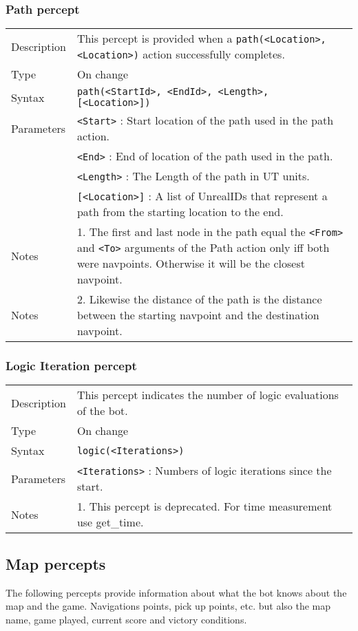\documentclass[11pt,a4paper]{article}
\begin{document}
\subsubsection*{Path percept}
\begin{small}
\begin{tabular}{p{2cm}p{9cm}}
Description & This percept is provided when a \verb|path(<Location>,<Location>)| action successfully completes. \\
Type & On change\\
Syntax & \verb|path(<StartId>, <EndId>, <Length>, [<Location>])|\\
Parameters 
	& \verb|<Start>| : Start location of the path used in the path action. \\
	& \verb|<End>| : End of location of the path used in the path. \\
	&  \verb|<Length>| : The Length of the path in UT units. \\
	& \verb|[<Location>]| : A list of UnrealIDs that represent a path from the starting location to the end. \\
Notes & 1.	The first and last node in the path equal the \verb|<From>| and \verb|<To>| arguments of the Path action only iff both were navpoints. Otherwise it will be the closest navpoint. \\
Notes & 2.	Likewise the distance of the path is the distance between the starting navpoint and the destination navpoint.
\end{tabular}
\end{small}

\subsubsection*{Logic Iteration percept}
\begin{small}
\begin{tabular}{p{2cm}p{9cm}}
Description & This percept indicates the number of logic evaluations of the bot. \\
Type & On change\\
Syntax & \verb|logic(<Iterations>)|\\
Parameters 
	&  \verb|<Iterations>| : Numbers of logic iterations since the start. \\
Notes & 1.	This percept is deprecated. For time measurement use get\_time. \\
\end{tabular}
\end{small}

\subsection{Map percepts}
The following percepts provide information about what the bot knows about the map and the game. Navigations points, pick up points, etc. but also the map name, game played, current score and victory conditions.
\end{document}
